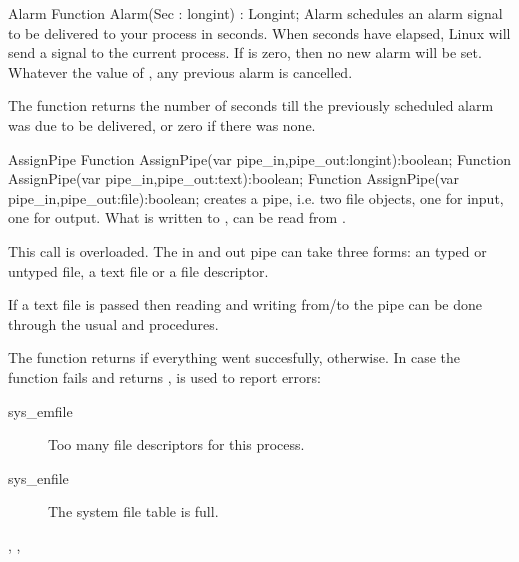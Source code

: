

\begin{function}{Alarm}
\Declaration
Function Alarm(Sec : longint) : Longint;
\Description
Alarm schedules an alarm signal to be delivered to your process in 
seconds. When  seconds have elapsed, Linux will send a 
signal to the current process.  If  is zero, then no new alarm will
be set. Whatever the value of , any previous alarm is cancelled.

The function returns the number of seconds till the previously scheduled
alarm was due to be delivered, or zero if there was none.
\end{function}




\begin{function}{AssignPipe}
\Declaration
Function  AssignPipe(var pipe\_in,pipe\_out:longint):boolean;
Function  AssignPipe(var pipe\_in,pipe\_out:text):boolean;
Function  AssignPipe(var pipe\_in,pipe\_out:file):boolean;
\Description
{} creates a pipe, i.e. two file objects, one for input, 
one for output. What is written to , can be read from 
. 

This call is overloaded. The in and out pipe can take three forms:
an typed or untyped file, a text file or a file descriptor.

If a text file is passed then reading and writing from/to the pipe 
can be done through the usual  and
 procedures.

The function returns  if everything went succesfully,
 otherwise.
\Errors
In case the function fails and returns ,  
is used to report errors:
\begin{description}
\item[sys\_emfile] Too many file descriptors for this process.
\item[sys\_enfile] The system file table is full.
\end{description}
\SeeAlso
{}, , 
\end{function}




